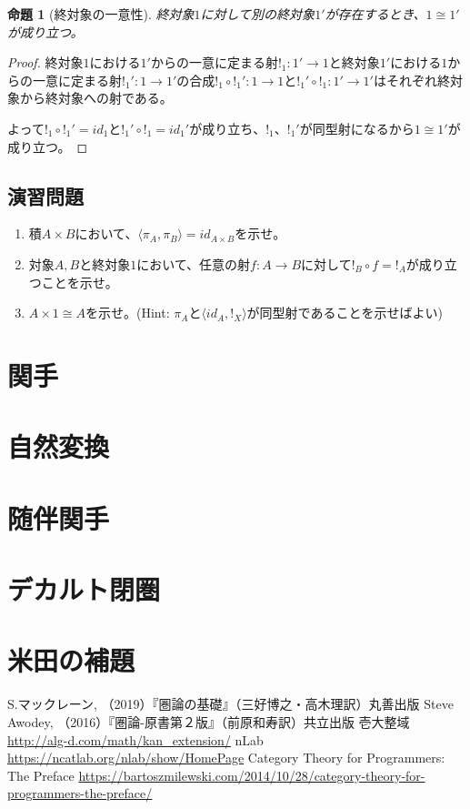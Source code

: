 \documentclass[dvipdfmx]{jsarticle}
\newcommand{\arrow}{\rightarrow}
\newcommand{\tuple}[1]{\langle #1\rangle}
\newcommand{\mor}[3]{#1:#2\arrow #3}
\newtheorem{proof}{証明}[section]
\newtheorem{prop}{命題}[section]
\numberwithin{proof}{subsection}
\numberwithin{prop}{subsection}
\numberwithin{define}{subsection}
\begin{document}
	\begin{prop}[終対象の一意性]
		終対象$1$に対して別の終対象$1'$が存在するとき、$1\cong 1'$が成り立つ。
	\end{prop}
	\begin{proof}
		終対象$1$における$1'$からの一意に定まる射$\mor{!_1}{1'}{1}$と終対象$1'$における$1$からの一意に定まる射$\mor{{!_1}'}{1}{1'}$の合成$\mor{!_1\circ {!_1}'}{1}{1}$と$\mor{{!_1}'\circ!_1}{1'}{1'}$はそれぞれ終対象から終対象への射である。

		よって$!_1\circ {!_1}'=id_1$と${!_1}'\circ!_1=id_1'$が成り立ち、$!_1$、${!_1}'$が同型射になるから$1\cong 1'$が成り立つ。
	\end{proof}

	\subsection{演習問題}
	\begin{enumerate}
		\item 積$A\times B$において、$\tuple{\pi_A,\pi_B}=id_{A\times B}$を示せ。
		\item 対象$A,B$と終対象$1$において、任意の射$\mor{f}{A}{B}$に対して$!_B\circ f=!_A$が成り立つことを示せ。
		\item $A\times 1\cong A$を示せ。(Hint: $\pi_A$と$\tuple{id_A,!_X}$が同型射であることを示せばよい)
	\end{enumerate}
	\section{関手}
	\section{自然変換}
	\section{随伴関手}
	\section{デカルト閉圏}
	\section{米田の補題}

	\begin{thebibliography}{99}
	 S.マックレーン, （2019）『圏論の基礎』（三好博之・高木理訳）丸善出版
	 Steve Awodey, （2016）『圏論-原書第２版』（前原和寿訳）共立出版
	 壱大整域 \url{http://alg-d.com/math/kan_extension/}
	 nLab \url{https://ncatlab.org/nlab/show/HomePage}
	 Category Theory for Programmers: The Preface \url{https://bartoszmilewski.com/2014/10/28/category-theory-for-programmers-the-preface/}
	\end{thebibliography}
\end{document}
